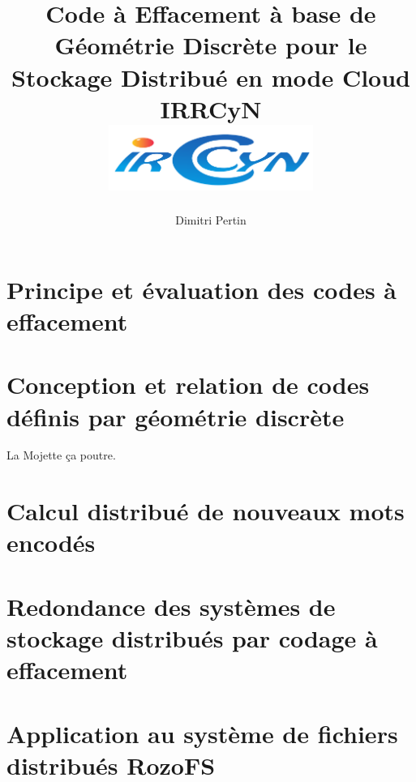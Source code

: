 
\makeindex



\title{
    {Code à Effacement à base de Géométrie Discrète pour le Stockage
    Distribué en mode Cloud}\\
    {\large IRRCyN}\\
    {\includegraphics[width=0.5\textwidth]{img/logo_irccyn.pdf}}
}
\author{Dimitri Pertin}
\date {}

\maketitle

\newpage

\tableofcontents

\chapter{Principe et évaluation des codes à effacement}



\chapter{Conception et relation de codes définis par géométrie discrète}

La Mojette ça poutre.



\chapter{Calcul distribué de nouveaux mots encodés}



\chapter{Redondance des systèmes de stockage distribués par codage à
effacement}



\chapter{Application au système de fichiers distribués RozoFS}



\newpage

\printbibliography[
]

\printindex


